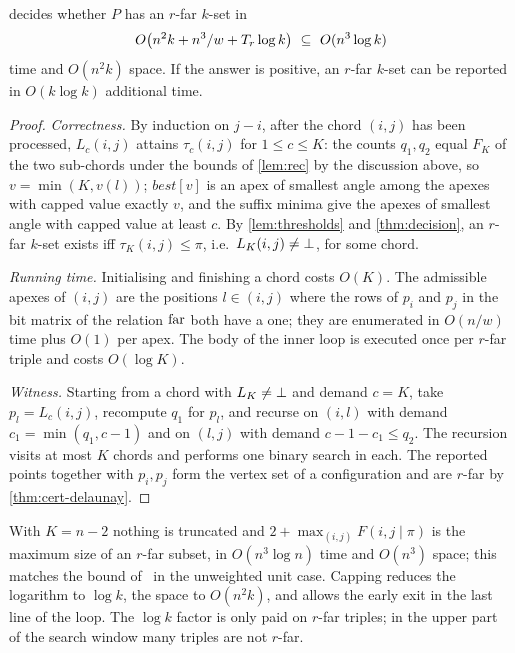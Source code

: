 \begin{theorem}\label{thm:decision-alg}
 decides whether $P$ has an $r$-far $k$-set in
\[
O\bigl(n^2k+n^3/w+\Tr\log k\bigr)\ \subseteq\ O(n^3\log k)
\]
time and $O(n^2k)$ space. If the answer is positive, an $r$-far $k$-set can be
reported in $O(k\log k)$ additional time.
\end{theorem}
\begin{proof}
\emph{Correctness.} By induction on $j-i$, after the chord $(i,j)$ has been
processed, $L_c(i,j)$ attains $\tau_c(i,j)$ for $1\le c\le K$: the counts
$q_1,q_2$ equal $F_K$ of the two sub-chords under the bounds of
\cref{lem:rec} by the discussion above, so $v=\min(K,v(l))$; $best[v]$ is an
apex of smallest angle among the apexes with capped value exactly $v$, and the
suffix minima give the apexes of smallest angle with capped value at least
$c$. By \cref{lem:thresholds} and \cref{thm:decision}, an $r$-far $k$-set
exists iff $\tau_K(i,j)\le\pi$, i.e.\ $L_K(i,j)\ne\bot$, for some chord.

\emph{Running time.} Initialising and finishing a chord costs $O(K)$. The
admissible apexes of $(i,j)$ are the positions $l\in(i,j)$ where the rows of
$p_i$ and $p_j$ in the bit matrix of the relation $\mathrm{far}$ both have a one; they
are enumerated in $O(n/w)$ time plus $O(1)$ per apex. The body of the inner
loop is executed once per $r$-far triple and costs $O(\log K)$.

\emph{Witness.} Starting from a chord with $L_K\ne\bot$ and demand $c=K$,
take $p_l=L_c(i,j)$, recompute $q_1$ for $p_l$, and recurse on $(i,l)$ with
demand $c_1=\min(q_1,c-1)$ and on $(l,j)$ with demand $c-1-c_1\le q_2$. The
recursion visits at most $K$ chords and performs one binary search in each.
The reported points together with $p_i,p_j$ form the vertex set of a
configuration and are $r$-far by \cref{thm:cert-delaunay}.
\end{proof}

\begin{remark}\label{rem:cap}
With $K=n-2$ nothing is truncated and $2+\max_{(i,j)}F(i,j\mid\pi)$ is the
maximum size of an $r$-far subset, in $O(n^3\log n)$ time and $O(n^3)$ space;
this matches the bound of~\citet{tw26} in the unweighted unit case. Capping
reduces the logarithm to $\log k$, the space to $O(n^2k)$, and allows the
early exit in the last line of the loop. The $\log k$ factor is only paid on
$r$-far triples; in the upper part of the search window many triples are not
$r$-far.
\end{remark}

